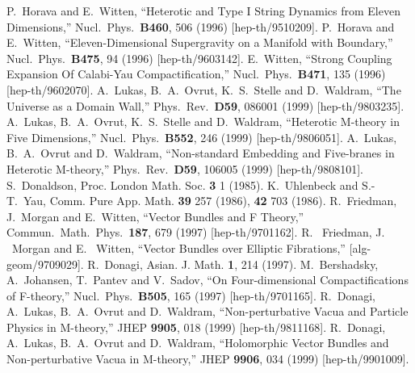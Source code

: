 \documentclass[a4paper,12pt]{article}
\numberwithin{equation}{section}
\theoremstyle{plain}
\begin{document}
\begin{thebibliography}{99}

   P.~Horava and E.~Witten,
   ``Heterotic and Type I String Dynamics from Eleven Dimensions,''
   Nucl.\ Phys.\  {\bf B460}, 506 (1996)
   [hep-th/9510209].
   P.~Horava and E.~Witten,
   ``Eleven-Dimensional Supergravity on a Manifold with Boundary,''
   Nucl.\ Phys.\  {\bf B475}, 94 (1996)
   [hep-th/9603142].
   E.~Witten,
   ``Strong Coupling Expansion Of Calabi-Yau Compactification,''
   Nucl.\ Phys.\  {\bf B471}, 135 (1996)
   [hep-th/9602070].
   A.~Lukas, B.~A.~Ovrut, K.~S.~Stelle and D.~Waldram,
   ``The Universe as a Domain Wall,''
   Phys.\ Rev.\  {\bf D59}, 086001 (1999)
   [hep-th/9803235].
   A.~Lukas, B.~A.~Ovrut, K.~S.~Stelle and D.~Waldram,
   ``Heterotic M-theory in Five Dimensions,''
   Nucl.\ Phys.\  {\bf B552}, 246 (1999)
   [hep-th/9806051].
   A.~Lukas, B.~A.~Ovrut and D.~Waldram,
   ``Non-standard Embedding and Five-branes in Heterotic M-theory,''
   Phys.\ Rev.\  {\bf D59}, 106005 (1999)
   [hep-th/9808101].
   S.~Donaldson,
   Proc. London Math. Soc. {\bf 3} 1 (1985).
   K.~Uhlenbeck and S.-T.~Yau,
   Comm. Pure App. Math. {\bf 39} 257 (1986), {\bf 42} 703 (1986).
   R.~Friedman, J.~Morgan and E.~Witten,
   ``Vector Bundles and F Theory,''
   Commun.\ Math.\ Phys.\  {\bf 187}, 679 (1997)
   [hep-th/9701162].
   R. ~Friedman, J. ~Morgan and E. ~Witten,
   ``Vector Bundles over Elliptic Fibrations,''
   [alg-geom/9709029].
   R.~Donagi,
   Asian. J. Math. {\bf 1}, 214 (1997).
   M.~Bershadsky, A.~Johansen, T.~Pantev and V.~Sadov,
   ``On Four-dimensional Compactifications of F-theory,''
   Nucl.\ Phys.\  {\bf B505}, 165 (1997)
   [hep-th/9701165].
   R.~Donagi, A.~Lukas, B.~A.~Ovrut and D.~Waldram,
   ``Non-perturbative Vacua and Particle Physics in M-theory,''
   JHEP {\bf 9905}, 018 (1999)
   [hep-th/9811168].
   R.~Donagi, A.~Lukas, B.~A.~Ovrut and D.~Waldram,
   ``Holomorphic Vector Bundles and Non-perturbative Vacua in M-theory,''
   JHEP {\bf 9906}, 034 (1999)
   [hep-th/9901009].

\end{thebibliography}
\end{document}
